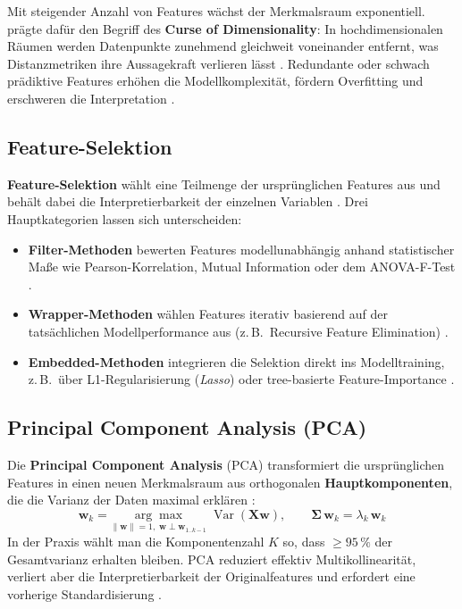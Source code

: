 Mit steigender Anzahl von Features wächst der Merkmalsraum exponentiell.
\textcite{Bellman1961} prägte dafür den Begriff des \textbf{Curse of
Dimensionality}: In hochdimensionalen Räumen werden Datenpunkte
zunehmend gleichweit voneinander entfernt, was Distanzmetriken ihre
Aussagekraft verlieren lässt \cite{HastieEtAl2009}. Redundante oder
schwach prädiktive Features erhöhen die Modellkomplexität, fördern
Overfitting und erschweren die Interpretation \cite{JamesEtAl2021}.

\subsection{Feature-Selektion}

\textbf{Feature-Selektion} wählt eine Teilmenge der ursprünglichen
Features aus und behält dabei die Interpretierbarkeit der einzelnen
Variablen \cite{GuyonElisseeff2003}. Drei Hauptkategorien lassen sich
unterscheiden:

\begin{itemize}
    \item \textbf{Filter-Methoden} bewerten Features modellunabhängig
          anhand statistischer Maße wie Pearson-Korrelation, Mutual
          Information oder dem ANOVA-F-Test \cite{Fisher1935,CoverThomas2006}.
    \item \textbf{Wrapper-Methoden} wählen Features iterativ basierend
          auf der tatsächlichen Modellperformance aus (z.\,B.\ Recursive
          Feature Elimination) \cite{KohaviJohn1997,GuyonEtAl2002}.
    \item \textbf{Embedded-Methoden} integrieren die Selektion direkt ins
          Modelltraining, z.\,B.\ über L1-Regularisierung (\textit{Lasso})
          \cite{Tibshirani1996} oder tree-basierte Feature-Importance
          \cite{Breiman2001,LundbergLee2017}.
\end{itemize}

\subsection{Principal Component Analysis (PCA)}

Die \textbf{Principal Component Analysis} (PCA) transformiert die
ursprünglichen Features in einen neuen Merkmalsraum aus orthogonalen
\textbf{Hauptkomponenten}, die die Varianz der Daten maximal erklären
\cite{Pearson1901,Hotelling1933,Jolliffe2002}:
\begin{equation}
    \mathbf{w}_k = \underset{\|\mathbf{w}\|=1,\; \mathbf{w} \perp \mathbf{w}_{1..k-1}}{\arg\max}\;
    \operatorname{Var}(\mathbf{X}\mathbf{w}), \qquad
    \boldsymbol{\Sigma}\, \mathbf{w}_k = \lambda_k\, \mathbf{w}_k
\end{equation}
In der Praxis wählt man die Komponentenzahl $K$ so, dass $\geq 95\,\%$
der Gesamtvarianz erhalten bleiben. PCA reduziert effektiv
Multikollinearität, verliert aber die Interpretierbarkeit der
Originalfeatures und erfordert eine vorherige Standardisierung
\cite{Bishop2006}.


